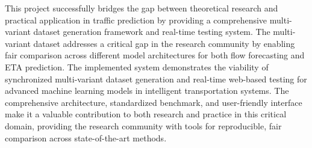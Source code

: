 This project successfully bridges the gap between theoretical research and practical application in traffic prediction by providing a comprehensive multi-variant dataset generation framework and real-time testing system. The multi-variant dataset addresses a critical gap in the research community by enabling fair comparison across different model architectures for both flow forecasting and ETA prediction. The implemented system demonstrates the viability of synchronized multi-variant dataset generation and real-time web-based testing for advanced machine learning models in intelligent transportation systems. The comprehensive architecture, standardized benchmark, and user-friendly interface make it a valuable contribution to both research and practice in this critical domain, providing the research community with tools for reproducible, fair comparison across state-of-the-art methods.

